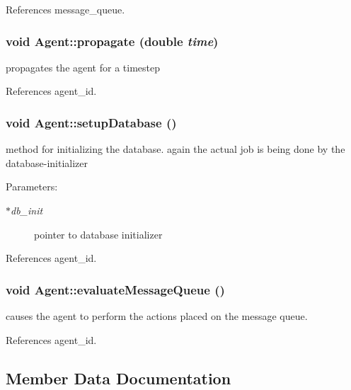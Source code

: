 References message\_\-queue.
\subsubsection[propagate]{\setlength{\rightskip}{0pt plus 5cm}void Agent::propagate (double {\em time})}\label{classAgent_6eb011086d7ad1640a466affe952b78f}


propagates the agent for a timestep 



References agent\_\-id.
\subsubsection[setupDatabase]{\setlength{\rightskip}{0pt plus 5cm}void Agent::setupDatabase ()}\label{classAgent_0bf4d254bc310eb8eb9ea16b50571ee3}


method for initializing the database. again the actual job is being done by the database-initializer \begin{Desc}
\item[Parameters:]
\begin{description}
\item[{\em $\ast$db\_\-init}]pointer to database initializer \end{description}
\end{Desc}


References agent\_\-id.
\subsubsection[evaluateMessageQueue]{\setlength{\rightskip}{0pt plus 5cm}void Agent::evaluateMessageQueue ()\hspace{0.3cm}{\tt  [protected]}}\label{classAgent_1da352e749752c141c4b3c4566c2023d}


causes the agent to perform the actions placed on the message queue. 



References agent\_\-id.

\subsection{Member Data Documentation}
